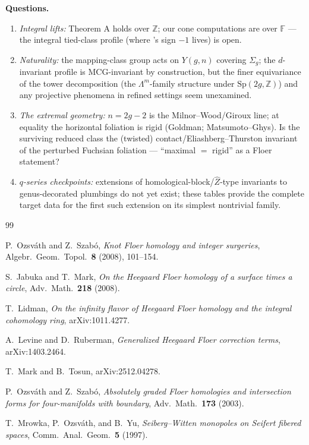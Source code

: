 \documentclass[11pt,reqno]{amsart}
\newcommand{\F}{\mathbb{F}}
\newcommand{\Z}{\mathbb{Z}}
\newcommand{\Sig}{\Sigma}
\newcommand{\Lam}{\Lambda}
\newcommand{\Ymg}{Y(g,n)}
\theoremstyle{plain}
\begin{document}
\medskip
\noindent\textbf{Questions.}
\begin{enumerate}
 \item \emph{Integral lifts:} Theorem A holds over $\Z$; our cone computations are over $\F$ --- the integral tied-class profile (where \cite{JM}'s sign $-1$ lives) is open.
 \item \emph{Naturality:} the mapping-class group acts on $\Ymg$ covering $\Sig_g$; the $d$-invariant profile is MCG-invariant by construction, but the finer equivariance of the tower decomposition (the $\Lam^{m}$-family structure under $\mathrm{Sp}(2g,\Z)$) and any projective phenomena in refined settings seem unexamined.
 \item \emph{The extremal geometry:} $n=2g-2$ is the Milnor--Wood/Giroux line; at equality the horizontal foliation is rigid (Goldman; Matsumoto--Ghys). Is the surviving reduced class the (twisted) contact/Eliashberg--Thurston invariant of the perturbed Fuchsian foliation --- ``maximal $=$ rigid'' as a Floer statement?
 \item \emph{$q$-series checkpoints:} extensions of homological-block/$\widehat{Z}$-type invariants to genus-decorated plumbings do not yet exist; these tables provide the complete target data for the first such extension on its simplest nontrivial family.
\end{enumerate}


\begin{thebibliography}{99}

 P.~Ozsv\'ath and Z.~Szab\'o, \emph{Knot Floer homology and integer surgeries}, Algebr.\ Geom.\ Topol.\ \textbf{8} (2008), 101--154.

 S.~Jabuka and T.~Mark, \emph{On the Heegaard Floer homology of a surface times a circle}, Adv.\ Math.\ \textbf{218} (2008).

 T.~Lidman, \emph{On the infinity flavor of Heegaard Floer homology and the integral cohomology ring}, arXiv:1011.4277.

 A.~Levine and D.~Ruberman, \emph{Generalized Heegaard Floer correction terms}, arXiv:1403.2464.

 T.~Mark and B.~Tosun, arXiv:2512.04278.

 P.~Ozsv\'ath and Z.~Szab\'o, \emph{Absolutely graded Floer homologies and intersection forms for four-manifolds with boundary}, Adv.\ Math.\ \textbf{173} (2003).

 T.~Mrowka, P.~Ozsv\'ath, and B.~Yu, \emph{Seiberg--Witten monopoles on Seifert fibered spaces}, Comm.\ Anal.\ Geom.\ \textbf{5} (1997).

\end{thebibliography}
\end{document}
